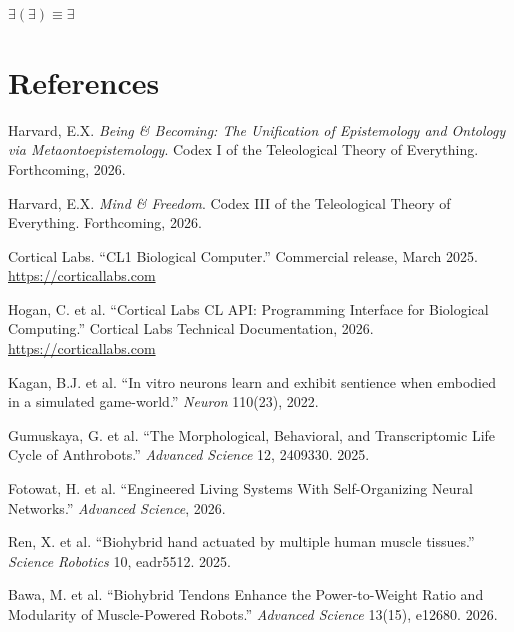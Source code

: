 \documentclass[12pt, letterpaper]{article}
\begin{document}
\vspace{2em}

\begin{center}
$\exists(\exists) \equiv \exists$
\end{center}

\newpage
\section*{References}

\begin{enumerate}[label={[\arabic*]}, nosep, leftmargin=2em]

\item Harvard, E.X. \textit{Being \& Becoming: The Unification of Epistemology and Ontology via Metaontoepistemology}. Codex I of the Teleological Theory of Everything. Forthcoming, 2026.

\item Harvard, E.X. \textit{Mind \& Freedom}. Codex III of the Teleological Theory of Everything. Forthcoming, 2026.

\item Cortical Labs. ``CL1 Biological Computer.'' Commercial release, March 2025. \url{https://corticallabs.com}

\item Hogan, C. et al. ``Cortical Labs CL API: Programming Interface for Biological Computing.'' Cortical Labs Technical Documentation, 2026. \url{https://corticallabs.com}

\item Kagan, B.J. et al. ``In vitro neurons learn and exhibit sentience when embodied in a simulated game-world.'' \textit{Neuron} 110(23), 2022.

\item Gumuskaya, G. et al. ``The Morphological, Behavioral, and Transcriptomic Life Cycle of Anthrobots.'' \textit{Advanced Science} 12, 2409330. 2025.

\item Fotowat, H. et al. ``Engineered Living Systems With Self-Organizing Neural Networks.'' \textit{Advanced Science}, 2026.

\item Ren, X. et al. ``Biohybrid hand actuated by multiple human muscle tissues.'' \textit{Science Robotics} 10, eadr5512. 2025.

\item Bawa, M. et al. ``Biohybrid Tendons Enhance the Power-to-Weight Ratio and Modularity of Muscle-Powered Robots.'' \textit{Advanced Science} 13(15), e12680. 2026.


\end{enumerate}
\end{document}
